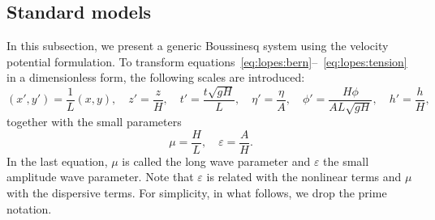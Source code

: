 \subsection{Standard models}
In this subsection, we present a generic Boussinesq system
using the velocity potential formulation.  To transform
equations~\eqref{eq:lopes:bern}--~\eqref{eq:lopes:tension}
in a dimensionless form, the following scales are
introduced:
\begin{equation}
( x', y')=\frac{1}{L}(x,y),\quad z'=\frac{z}{H}, \quad
  t'=\frac{t\sqrt{gH}}{L},\quad \eta'=\frac{\eta}{A},\quad
  \phi'= \frac{H\phi}{AL\sqrt{gH}},\quad h'=\frac{h}{H},
\end{equation}
together with the small parameters
\begin{equation}
\mu=\frac{H}{L},\quad \varepsilon=\frac{A}{H}.
\end{equation}
In the last equation, $\mu$ is called the long wave
parameter and $\varepsilon$ the small amplitude wave
parameter.  Note that $\varepsilon$ is related with the
nonlinear terms and $\mu$ with the dispersive terms.  For
simplicity, in what follows, we drop the prime notation.

